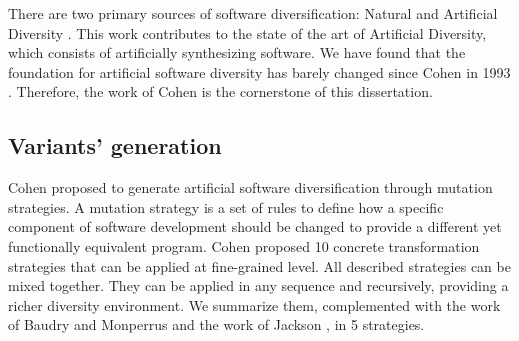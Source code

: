 





There are two primary sources of software diversification: Natural and Artificial Diversity \cite{natural_diversity}. This work contributes to the state of the art of Artificial Diversity, which consists of artificially synthesizing software. 
We have found that the foundation for artificial software diversity has barely changed since Cohen in 1993 \cite{cohen1993operating}. Therefore, the work of Cohen is the cornerstone of this dissertation.




\subsection*{Variants' generation}
Cohen \etal proposed to generate artificial software diversification through mutation strategies.
A mutation strategy is a set of rules to define how a specific component of software development should be changed to provide a different yet functionally equivalent program. Cohen \etal proposed 10 concrete transformation strategies that can be applied at fine-grained level. 
All described strategies can be mixed together. They can be applied in any sequence and recursively, providing a richer diversity environment. We summarize them, complemented with the work of Baudry and Monperrus \cite{natural_diversity} and the work of Jackson \etal \cite{jackson}, in 5 strategies.



